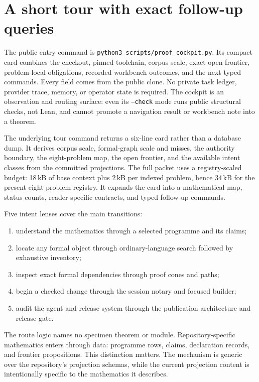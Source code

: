 \documentclass[11pt]{article}
\begin{document}
\section{A short tour with exact follow-up queries}\label{sec:tour}

The public entry command is
\texttt{python3 scripts/proof\_cockpit.py}.  Its compact card combines the
checkout, pinned toolchain, corpus scale, exact open frontier, problem-local
obligations, recorded workbench outcomes, and the next typed commands.  Every
field comes from the public clone.  No private task ledger, provider trace,
memory, or operator state is required.  The cockpit is an observation and
routing surface: even its \texttt{--check} mode runs public structural checks,
not Lean, and cannot promote a navigation result or workbench note into a
theorem.

The underlying tour command returns a six-line card rather than a database dump. It
derives corpus scale, formal-graph scale and misses, the authority boundary,
the eight-problem map, the open frontier, and the available intent classes from the committed
projections. The full packet uses a registry-scaled budget: 18\,kB of base
context plus 2\,kB per indexed problem, hence 34\,kB for the present eight-problem
registry. It expands the card into a mathematical map, status counts,
reader-specific contracts, and typed follow-up commands.

Five intent lenses cover the main transitions:
\begin{enumerate}
\item understand the mathematics through a selected programme and its claims;
\item locate any formal object through ordinary-language search followed by
      exhaustive inventory;
\item inspect exact formal dependencies through proof cones and paths;
\item begin a checked change through the session notary and focused builder;
\item audit the agent and release system through the publication architecture
      and release gate.
\end{enumerate}
The route logic names no specimen theorem or module. Repository-specific
mathematics enters through data: programme rows, claims, declaration records,
and frontier propositions. This distinction matters. The mechanism is generic
over the repository's projection schemas, while the current projection content
is intentionally specific to the mathematics it describes.
\end{document}
